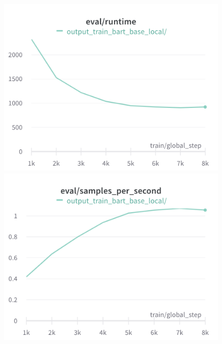 \begin{figure}[!htb]
\includegraphics[width=\linewidth]{wandb/charts/Section-4-Panel-4-nuos3yp7v}
\caption{}
\endminipage\hfill
{}
\includegraphics[width=\linewidth]{wandb/charts/Section-4-Panel-5-noz0rp558}
\caption{}
\endminipage
\end{figure}

